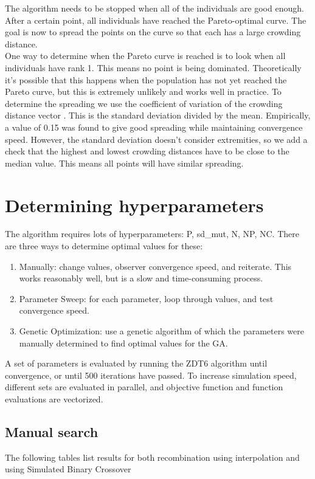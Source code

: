 The algorithm needs to be stopped when all of the individuals are good enough. After a certain point, all individuals have reached the Pareto-optimal curve. The goal is now to spread the points on the curve so that each has a large crowding distance. \\
One way to determine when the Pareto curve is reached is to look when all individuals have rank 1. This means no point is being dominated. Theoretically it's possible that this happens when the population has not yet reached the Pareto curve, but this is extremely unlikely and works well in practice. 
To determine the spreading we use the coefficient of variation of the crowding distance vector \cite{CV}. This is the standard deviation divided by the mean. Empirically, a value of 0.15 was found to give good spreading while maintaining convergence speed. However, the standard deviation doesn't consider extremities, so we add a check that the highest and lowest crowding distances have to be close to the median value. This means all points will have similar spreading.

\section{Determining hyperparameters} \label{hyperparameters}
The algorithm requires lots of hyperparameters: P, sd_mut, N, NP, NC. There are three ways to determine optimal values for these:
\begin{enumerate}
\item Manually: change values, observer convergence speed, and reiterate. This works reasonably well, but is a slow and time-consuming process.
\item Parameter Sweep: for each parameter, loop through values, and test convergence speed.
\item Genetic Optimization: use a genetic algorithm of which the parameters were manually determined to find optimal values for the GA.
\end{enumerate}
A set of parameters is evaluated by running the ZDT6 algorithm until convergence, or until 500 iterations have passed. To increase simulation speed, different sets are evaluated in parallel, and objective function and function evaluations are vectorized.

\subsection{Manual search}
The following tables list results for both recombination using interpolation and using Simulated Binary Crossover

